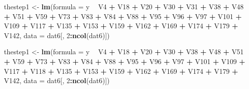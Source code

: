 \documentclass[
]{article}
\newenvironment{Shaded}{\begin{snugshade}}{\end{snugshade}}
\newcommand{\DataTypeTok}[1]{\textcolor[rgb]{0.13,0.29,0.53}{#1}}
\newcommand{\DecValTok}[1]{\textcolor[rgb]{0.00,0.00,0.81}{#1}}
\newcommand{\KeywordTok}[1]{\textcolor[rgb]{0.13,0.29,0.53}{\textbf{#1}}}
\newcommand{\NormalTok}[1]{#1}
\newcommand{\OperatorTok}[1]{\textcolor[rgb]{0.81,0.36,0.00}{\textbf{#1}}}
\newcommand{\StringTok}[1]{\textcolor[rgb]{0.31,0.60,0.02}{#1}}
\begin{document}
\begin{Shaded}
\begin{Highlighting}[]
\NormalTok{thestep1 <-}\StringTok{ }\KeywordTok{lm}\NormalTok{(}\DataTypeTok{formula =}\NormalTok{ y }\OperatorTok{~}\StringTok{ }\NormalTok{V4 }\OperatorTok{+}\StringTok{ }\NormalTok{V18 }\OperatorTok{+}\StringTok{ }\NormalTok{V20 }\OperatorTok{+}\StringTok{ }\NormalTok{V30 }\OperatorTok{+}\StringTok{ }\NormalTok{V31 }\OperatorTok{+}\StringTok{ }\NormalTok{V38 }\OperatorTok{+}\StringTok{ }\NormalTok{V48 }\OperatorTok{+}\StringTok{ }\NormalTok{V51 }\OperatorTok{+}\StringTok{ }
\StringTok{    }\NormalTok{V59 }\OperatorTok{+}\StringTok{ }\NormalTok{V73 }\OperatorTok{+}\StringTok{ }\NormalTok{V83 }\OperatorTok{+}\StringTok{ }\NormalTok{V84 }\OperatorTok{+}\StringTok{ }\NormalTok{V88 }\OperatorTok{+}\StringTok{ }\NormalTok{V95 }\OperatorTok{+}\StringTok{ }\NormalTok{V96 }\OperatorTok{+}\StringTok{ }\NormalTok{V97 }\OperatorTok{+}\StringTok{ }\NormalTok{V101 }\OperatorTok{+}\StringTok{ }\NormalTok{V109 }\OperatorTok{+}\StringTok{ }
\StringTok{    }\NormalTok{V117 }\OperatorTok{+}\StringTok{ }\NormalTok{V135 }\OperatorTok{+}\StringTok{ }\NormalTok{V153 }\OperatorTok{+}\StringTok{ }\NormalTok{V159 }\OperatorTok{+}\StringTok{ }\NormalTok{V162 }\OperatorTok{+}\StringTok{ }\NormalTok{V169 }\OperatorTok{+}\StringTok{ }
\StringTok{    }\NormalTok{V174 }\OperatorTok{+}\StringTok{ }\NormalTok{V179 }\OperatorTok{+}\StringTok{ }\NormalTok{V142, }\DataTypeTok{data =}\NormalTok{ dat6[, }\DecValTok{2}\OperatorTok{:}\KeywordTok{ncol}\NormalTok{(dat6)])}

\NormalTok{thestep1 <-}\StringTok{ }\KeywordTok{lm}\NormalTok{(}\DataTypeTok{formula =}\NormalTok{ y }\OperatorTok{~}\StringTok{ }\NormalTok{V4 }\OperatorTok{+}\StringTok{ }\NormalTok{V18 }\OperatorTok{+}\StringTok{ }\NormalTok{V20 }\OperatorTok{+}\StringTok{ }\NormalTok{V30 }\OperatorTok{+}\StringTok{ }\NormalTok{V38 }\OperatorTok{+}\StringTok{ }\NormalTok{V48 }\OperatorTok{+}\StringTok{ }\NormalTok{V51 }\OperatorTok{+}\StringTok{ }
\StringTok{    }\NormalTok{V59 }\OperatorTok{+}\StringTok{ }\NormalTok{V73 }\OperatorTok{+}\StringTok{ }\NormalTok{V83 }\OperatorTok{+}\StringTok{ }\NormalTok{V84 }\OperatorTok{+}\StringTok{ }\NormalTok{V88 }\OperatorTok{+}\StringTok{ }\NormalTok{V95 }\OperatorTok{+}\StringTok{ }\NormalTok{V96 }\OperatorTok{+}\StringTok{ }\NormalTok{V97 }\OperatorTok{+}\StringTok{ }\NormalTok{V101 }\OperatorTok{+}\StringTok{ }\NormalTok{V109 }\OperatorTok{+}\StringTok{ }
\StringTok{    }\NormalTok{V117 }\OperatorTok{+}\StringTok{ }\NormalTok{V118 }\OperatorTok{+}\StringTok{ }\NormalTok{V135 }\OperatorTok{+}\StringTok{ }\NormalTok{V153 }\OperatorTok{+}\StringTok{ }\NormalTok{V159 }\OperatorTok{+}\StringTok{ }\NormalTok{V162 }\OperatorTok{+}\StringTok{ }\NormalTok{V169 }\OperatorTok{+}\StringTok{ }
\StringTok{    }\NormalTok{V174 }\OperatorTok{+}\StringTok{ }\NormalTok{V179 }\OperatorTok{+}\StringTok{ }\NormalTok{V142, }\DataTypeTok{data =}\NormalTok{ dat6[, }\DecValTok{2}\OperatorTok{:}\KeywordTok{ncol}\NormalTok{(dat6)])}


\end{Highlighting}
\end{Shaded}
\end{document}
